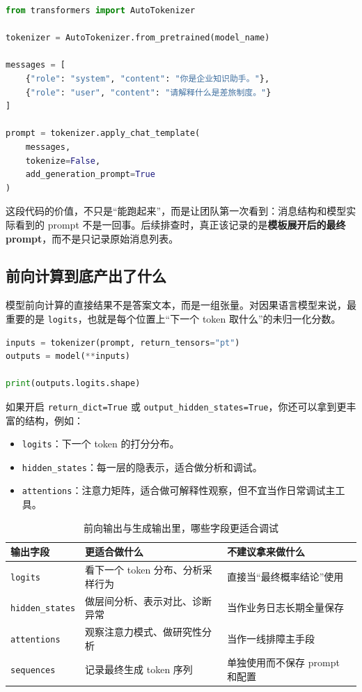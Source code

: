 \begin{lstlisting}[language=Python]
from transformers import AutoTokenizer

tokenizer = AutoTokenizer.from_pretrained(model_name)

messages = [
    {"role": "system", "content": "你是企业知识助手。"},
    {"role": "user", "content": "请解释什么是差旅制度。"}
]

prompt = tokenizer.apply_chat_template(
    messages,
    tokenize=False,
    add_generation_prompt=True
)
\end{lstlisting}

这段代码的价值，不只是“能跑起来”，而是让团队第一次看到：消息结构和模型实际看到的 prompt 不是一回事。后续排查时，真正该记录的是\textbf{模板展开后的最终 prompt}，而不是只记录原始消息列表。

\subsection{前向计算到底产出了什么}
模型前向计算的直接结果不是答案文本，而是一组张量。对因果语言模型来说，最重要的是 \texttt{logits}，也就是每个位置上“下一个 token 取什么”的未归一化分数。

\begin{lstlisting}[language=Python]
inputs = tokenizer(prompt, return_tensors="pt")
outputs = model(**inputs)

print(outputs.logits.shape)
\end{lstlisting}

如果开启 \texttt{return\_dict=True} 或 \texttt{output\_hidden\_states=True}，你还可以拿到更丰富的结构，例如：
\begin{itemize}
  \item \texttt{logits}：下一个 token 的打分分布。
  \item \texttt{hidden\_states}：每一层的隐表示，适合做分析和调试。
  \item \texttt{attentions}：注意力矩阵，适合做可解释性观察，但不宜当作日常调试主工具。
\end{itemize}

\begin{table}[H]
\centering
\small
\begin{tabularx}{\textwidth}{>{\raggedright\arraybackslash}p{3.2cm}>{\raggedright\arraybackslash}p{3.6cm}>{\raggedright\arraybackslash}X}
\toprule
\textbf{输出字段} & \textbf{更适合做什么} & \textbf{不建议拿来做什么} \\
\midrule
\texttt{logits} & 看下一个 token 分布、分析采样行为 & 直接当“最终概率结论”使用 \\
\texttt{hidden\_states} & 做层间分析、表示对比、诊断异常 & 当作业务日志长期全量保存 \\
\texttt{attentions} & 观察注意力模式、做研究性分析 & 当作一线排障主手段 \\
\texttt{sequences} & 记录最终生成 token 序列 & 单独使用而不保存 prompt 和配置 \\
\bottomrule
\end{tabularx}
\caption{前向输出与生成输出里，哪些字段更适合调试}
\label{tab:model-output-fields}
\end{table}

